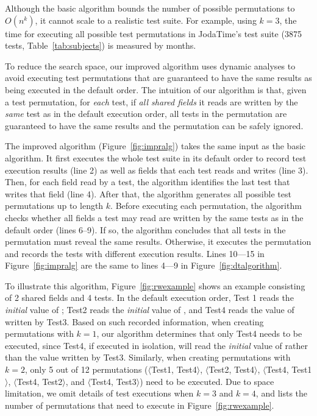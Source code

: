 Although the basic algorithm bounds the
number of possible permutations to $O(n^k)$,
it cannot scale to a realistic test suite.
For example, using $k=3$, the time for
executing all possible test permutations
in JodaTime's test suite (3875 tests, Table~\ref{tab:subjects})
is measured by months.

To reduce the search space, our improved algorithm
uses dynamic analyses to avoid executing test
permutations that are guaranteed to have the
same results as being executed in the default order.
The intuition of our algorithm is that,
given a test permutation, for \textit{each}
test, if \textit{all shared fields} 
 it reads
are written by the \textit{same} test as
in the default execution order, all tests in
the permutation are guaranteed to
have the same results and the permutation can be safely ignored. 

The improved algorithm (Figure~\ref{fig:impralg}) takes the same
input as the basic algorithm. It first executes the whole
test suite in its default order
to record test execution results (line 2) as
well as fields that each test reads and writes (line 3).
Then, for each field read by a test,
the algorithm identifies the last test that writes
that field (line 4).
After that, the algorithm generates all possible test permutations
up to length $k$. Before executing each permutation, 
the algorithm checks whether all fields a test may read are written
by the same tests as in the default order (lines 6--9).
If so, the algorithm concludes that all tests in the permutation
must reveal the same results. Otherwise,
it executes the permutation and records the tests with
different execution results. Lines 10---15 in Figure~\ref{fig:impralg}
are the same to lines 4---9 in Figure~\ref{fig:dtalgorithm}.



To illustrate this algorithm, Figure~\ref{fig:rwexample} shows an example
consisting of 2 shared fields and 4 tests. In the default execution
order, Test 1 reads the \textit{initial} value of ;
Test2 reads the \textit{initial} value of , and Test4
reads the value of  written by Test3.
Based on such recorded information, when creating permutations with $k=1$,
our algorithm determines that only
Test4 needs to be executed, since Test4, if executed in isolation,
will read the \textit{initial} value of  rather than the 
value written by Test3. Similarly, when creating permutations with $k=2$,
only 5 out of 12 permutations ($\langle$Test1, Test4$\rangle$,
$\langle$Test2, Test4$\rangle$, $\langle$Test4, Test1$\rangle$,
$\langle$Test4, Test2$\rangle$, and $\langle$Test4, Test3$\rangle$) need to be executed.
Due to space limitation, we omit details of test executions when
$k=3$ and $k=4$, and lists the number of permutations that need
to execute in Figure~\ref{fig:rwexample}.

